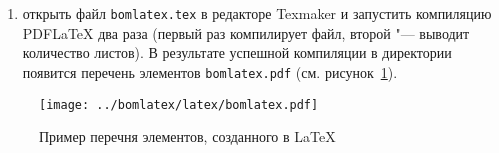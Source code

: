 \begin{enumerate}
	\item открыть файл \texttt{bomlatex.tex} в редакторе Texmaker и запустить компиляцию PDFLaTeX два раза (первый раз компилирует файл, второй "--- выводит количество листов). В результате успешной компиляции в директории появится перечень элементов \texttt{bomlatex.pdf} (см. рисунок~\ref{f:pdf}).

\end{enumerate}



\begin{figure}[p]
	\centering
	\texttt{[image: ../bomlatex/latex/bomlatex.pdf]}
	\caption{Пример перечня элементов, созданного в \LaTeX}
	\label{f:pdf}
\end{figure}
